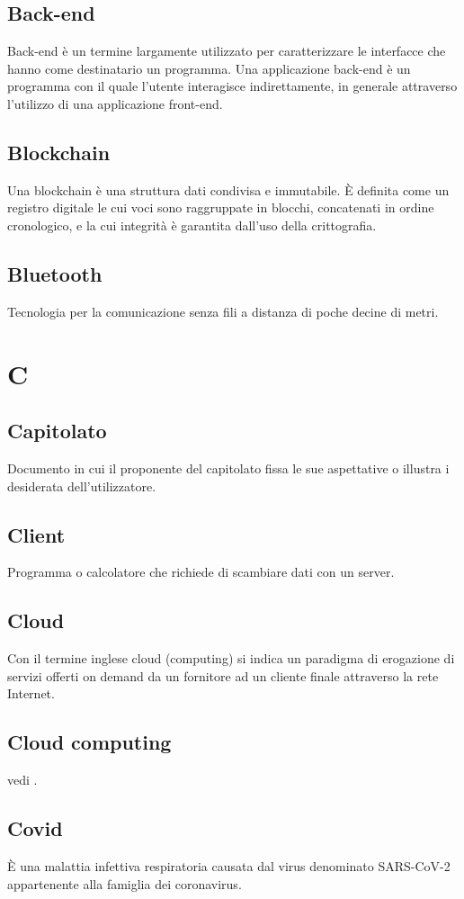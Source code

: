 \subsection{Back-end} Back-end è un termine largamente utilizzato per caratterizzare le interfacce che hanno come destinatario un programma. Una applicazione back-end è un programma con il quale l'utente interagisce indirettamente, in generale attraverso l'utilizzo di una applicazione front-end.
\subsection{Blockchain} Una blockchain è una struttura dati condivisa e immutabile. È definita come un registro
digitale le cui voci sono raggruppate in blocchi, concatenati in ordine cronologico, e la cui integrità è garantita dall'uso della crittografia.
\subsection{Bluetooth} Tecnologia per la comunicazione senza fili a distanza di poche decine di metri.
\newpage \section{C}
\subsection{Capitolato} Documento in cui il proponente del capitolato fissa le sue aspettative o illustra i desiderata dell'utilizzatore.
\subsection{Client} Programma o calcolatore che richiede di scambiare dati con un server.
\subsection{Cloud} Con il termine inglese cloud (computing) si indica un paradigma di erogazione di servizi offerti on demand da un fornitore ad un cliente finale attraverso la rete Internet.
\subsection{Cloud computing} vedi .
\subsection{Covid} È una malattia infettiva respiratoria causata dal virus denominato SARS-CoV-2 appartenente alla famiglia dei coronavirus.
